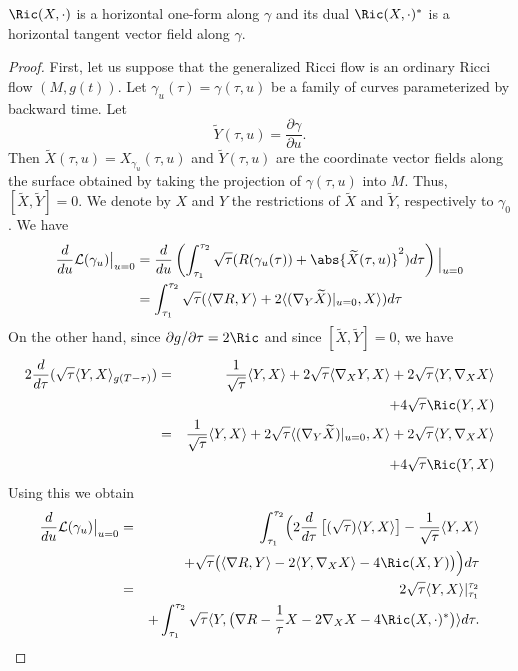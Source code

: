 \begin{remark}\label{rem:ricci-one-form-dual}
$\Ric(X,\cdot)$ is a horizontal one-form along $\gamma$ and its
dual $\Ric(X,\cdot)^*$ is a horizontal tangent vector field
along $\gamma$.
\end{remark}

\begin{proof}
\sketch
{}
First, let us suppose that the
generalized Ricci flow is an ordinary Ricci flow $(M,g(t))$. Let
$\gamma_u(\tau)=\gamma(\tau,u)$ be a family of curves parameterized
by backward time. Let
$$\widetilde Y(\tau,u)=\frac{\partial\gamma}{\partial u}.$$ Then $\widetilde X(\tau,u)=X_{\gamma_u}(\tau,u)$
 and $\widetilde Y(\tau,u)$
are  the coordinate vector fields along the surface obtained by taking the
projection of $\gamma(\tau,u)$ into $M$. Thus, $[\widetilde X,\widetilde Y]
=0$. We denote by $X$ and $Y$ the restrictions of $\widetilde X$ and
$\widetilde Y$, respectively to $\gamma_0$. We have
\begin{align*}
\frac{d}{du}\mathcal{L}(\gamma_{u})\bigl|_{u=0}\bigr.  & =
\frac{d}{du}\left(\int_{\tau_{1}}^{\tau_{2}}
\sqrt{\tau}(R(\gamma_u(\tau)) + \abs{\widetilde
X(\tau,u)}^{2})d\tau\right)\Bigl|_{u=0}\Bigr.
\\&=\int_{\tau_{1}}^{\tau_{2}} \sqrt{\tau}(\langle \nabla R, Y\rangle  +
2\langle (\nabla_{Y}\widetilde X)|_{u=0},X\rangle )d\tau
\end{align*}
On the other hand, since $\partial g/\partial \tau =2\Ric$ and
since $[\widetilde X,\widetilde Y]=0$, we have
\begin{eqnarray*} 2\frac{d}{d\tau}(\sqrt{\tau}\langle Y,X\rangle_{g(T-\tau)} )
& = & \frac{1}{\sqrt{\tau}}\langle Y,X\rangle +
2\sqrt{\tau}\langle\nabla_XY,X\rangle
+2\sqrt{\tau}\langle Y,\nabla_XX\rangle \\ & & +4\sqrt{\tau}\Ric(Y,X) \\
& = & \frac{1}{\sqrt{\tau}}\langle Y,X\rangle  +
2\sqrt{\tau}\langle(\nabla_Y\widetilde X)|_{u=0},X\rangle
+2\sqrt{\tau}\langle Y,\nabla_XX\rangle \\ & &  +4\sqrt{\tau}\Ric(Y,X)
\end{eqnarray*}
Using this we obtain \begin{eqnarray}\nonumber \frac{d}{du}
\mathcal{L}(\gamma_u)\bigl|_{u=0}\bigr. & = & \int_{\tau_1}^{\tau_2}
\Bigl(2\frac{d}{d\tau}\left[(\sqrt{\tau})\langle
Y,X\rangle\right]-\frac{1}{\sqrt{\tau}}\langle
Y,X\rangle\Bigr. \\
& & +\sqrt{\tau}\bigl(\langle\nabla R,Y\rangle
 - 2\langle Y,\nabla_{X}X\rangle  - 4\Ric(X,Y)\bigr)\Bigr)d\tau \nonumber \\
 & = & 2\sqrt{\tau}\langle Y,X\rangle |_{\tau_{1}}^{\tau_{2}} \nonumber \\
& & + \int_{\tau_{1}}^{\tau_{2}} \sqrt{\tau}\langle Y,\bigl(\nabla R
- \frac{1}{\tau}X - 2\nabla_{X}X - 4\Ric(X,\cdot)^*\bigr)\rangle d\tau.\label{variation}
\end{eqnarray}


\end{proof}
